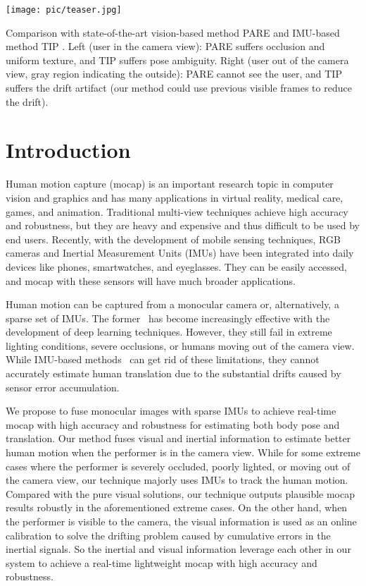 \documentclass[sigconf,nonacm=true]{acmart}
\begin{document}
\begin{teaserfigure}
  \texttt{[image: pic/teaser.jpg]}
  \caption{Comparison with state-of-the-art vision-based method PARE \cite{PARE} and IMU-based method TIP \cite{TIP}. Left (user in the camera view): PARE suffers occlusion and uniform texture, and TIP suffers pose ambiguity. Right (user out of the camera view, gray region indicating the outside): PARE cannot see the user, and TIP suffers the drift artifact (our method could use previous visible frames to reduce the drift). }
  \label{fig:teaser}
\end{teaserfigure}


\maketitle
\section{Introduction}
Human motion capture (mocap) is an important research topic in computer vision and graphics and has many applications in virtual reality, medical care, games, and animation.
Traditional multi-view techniques achieve high accuracy and robustness, but they are heavy and expensive and thus difficult to be used by end users.
Recently, with the development of mobile sensing techniques, RGB cameras and Inertial Measurement Units (IMUs) have been integrated into daily devices like phones, smartwatches, and eyeglasses. 
They can be easily accessed, and mocap with these sensors will have much broader applications.
\par
Human motion can be captured from a monocular camera or, alternatively, a sparse set of IMUs.
The former~\cite{ROMP,spin,PARE,VIBE} has become increasingly effective with the development of deep learning techniques.
However, they still fail in extreme lighting conditions, severe occlusions, or humans moving out of the camera view.
While IMU-based methods~\cite{DIP,TransPose,PIP,TIP} can get rid of these limitations, they cannot accurately estimate human translation due to the substantial drifts caused by sensor error accumulation.
\par
We propose to fuse monocular images with sparse IMUs to achieve real-time mocap with high accuracy and robustness for estimating both body pose and translation.
Our method fuses visual and inertial information to estimate better human motion when the performer is in the camera view.
While for some extreme cases where the performer is severely occluded, poorly lighted, or moving out of the camera view, our technique majorly uses IMUs to track the human motion.
Compared with the pure visual solutions, our technique outputs plausible mocap results robustly in the aforementioned extreme cases. On the other hand, when the performer is visible to the camera, the visual information is used as an online calibration to solve the drifting problem caused by cumulative errors in the inertial signals.
So the inertial and visual information leverage each other in our system to achieve a real-time lightweight mocap with high accuracy and robustness.
\par
\end{document}
